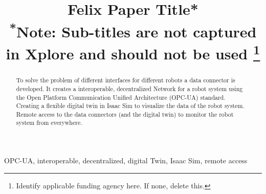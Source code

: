 \documentclass[conference]{IEEEtran}
\begin{document}
\title{Felix Paper Title*\\
{\footnotesize \textsuperscript{*}Note: Sub-titles are not captured in Xplore and
should not be used}
\thanks{Identify applicable funding agency here. If none, delete this.}
}

\author{
\and
{}
\and
{}
}

\maketitle

\begin{abstract}
To solve the problem of different interfaces for different robots a data connector is developed.
It creates a interoperable, decentralized Network for a robot system using the Open Platform Communication Unified Architecture (OPC-UA) standard.
Creating a flexible digital twin in Isaac Sim to visualize the data of the robot system.
Remote access to the data connectors (and the digital twin) to monitor the robot system from everywhere.
\end{abstract}

\begin{IEEEkeywords}
OPC-UA, interoperable, decentralized, digital Twin, Isaac Sim, remote access
\end{IEEEkeywords}
\end{document}
